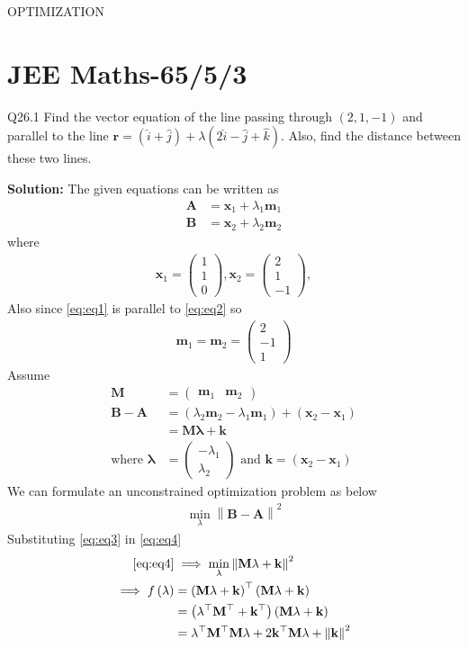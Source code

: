 \documentclass[12pt]{article}
\providecommand{\brak}[1]{\ensuremath{\left(#1\right)}}
\providecommand{\norm}[1]{\left\lVert#1\right\rVert}
\newcommand{\solution}{\noindent \textbf{Solution: }}
\newcommand{\myvec}[1]{\ensuremath{\begin{pmatrix}#1\end{pmatrix}}}
\let\vec\mathbf
\begin{document}
\begin{center}
\textbf\large{OPTIMIZATION}

\end{center}
\section*{JEE Maths-65/5/3}

Q26.1 Find the vector equation of the line passing through $\brak{2,1,-1}$ and parallel to the line $\vec{r} = \brak{\hat{i}+\hat{j}}+\lambda\brak{2\hat{i}-\hat{j}+\hat{k}}$. Also, find the distance between these two lines.

\solution
The given equations can be written as
\begin{align}
	\label{eq:eq1}
	\vec{A} &= \vec{x}_1+\lambda_1\vec{m}_1\\
	\label{eq:eq2}
	\vec{B} &= \vec{x}_2 + \lambda_2\vec{m}_2 
\end{align}
where
\begin{align}
	\vec{x}_1 = \myvec{1\\1\\0}, \vec{x}_2 = \myvec{2\\1\\-1},
\end{align}
Also since \eqref{eq:eq1} is parallel to \eqref{eq:eq2} so
\begin{align}
	\vec{m}_1 = \vec{m}_2 = \myvec{2\\-1\\1}
\end{align}
Assume
\begin{align}
	\vec{M} &= \myvec{\vec{m}_1 & \vec{m}_2}\\
	\vec{B}-\vec{A} &= \brak{\lambda_2\vec{m}_2-\lambda_1\vec{m}_1}+\brak{\vec{x}_2-\vec{x}_1}\\
	\label{eq:eq3}
	 &= \vec{M}\vec{\lambda}+\vec{k}\\
	 \text{where } \vec{\lambda}&=\myvec{-\lambda_1\\\lambda_2} \text{ and } \vec{k} = \brak{\vec{x}_2-\vec{x}_1}
\end{align} 
We can formulate an unconstrained optimization problem as below
\begin{align}
	\label{eq:eq4}
	\min_{\lambda} \norm{\vec{B}-\vec{A}}^2
\end{align}
Substituting \eqref{eq:eq3} in \eqref{eq:eq4}
\begin{align}
	\eqref{eq:eq4} &\implies \min_{\lambda}\norm{\vec{M}\vec{\lambda}+\vec{k}}^2\\
	\implies f\brak{\vec{\lambda}} &= \brak{\vec{M}\vec{\lambda}+\vec{k}}^\top\brak{\vec{M}\vec{\lambda}+\vec{k}}\\
	&= \brak{\vec{\lambda}^\top\vec{M}^\top+\vec{k}^\top}\brak{\vec{M}\vec{\lambda}+\vec{k}}\\
	\label{eq:eq5}
	&= \vec{\lambda}^\top\vec{M}^\top\vec{M}\vec{\lambda}+2\vec{k}^\top\vec{M}\vec{\lambda}+\norm{\vec{k}}^2
\end{align}
\end{document}
